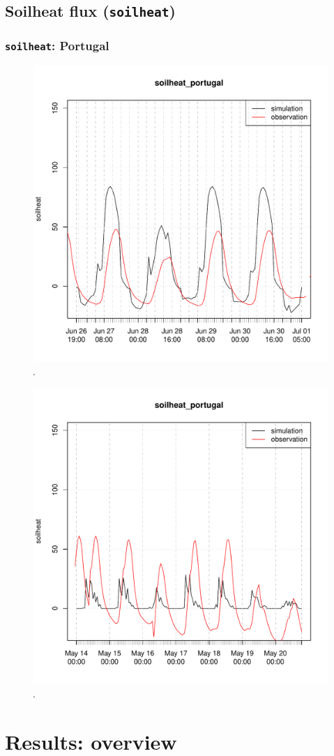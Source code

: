 \documentclass{scrreprt}
\begin{document}
\newpage
\section{Soilheat flux (\texttt{soilheat})}

\subsection{\texttt{soilheat}: Portugal}

\begin{figure}[ht]
  \centering
  \includegraphics[width=0.5\hsize]{./fig/plot_soilheat_compare_portugal_HS_2014-06-26_2014-07-01.pdf}
  \caption{.}
  \label{fig:portugal_HS_soilheat1}
\end{figure}

\begin{figure}[ht]
  \centering
  \includegraphics[width=0.5\hsize]{./fig/plot_soilheat_compare_portugal_NSA_2014-05-13_2014-05-20.pdf}
  \caption{.}
  \label{fig:portugal_NSA_soilheat1}
\end{figure}



\chapter{Results: overview} \label{ch:results}
\end{document}
